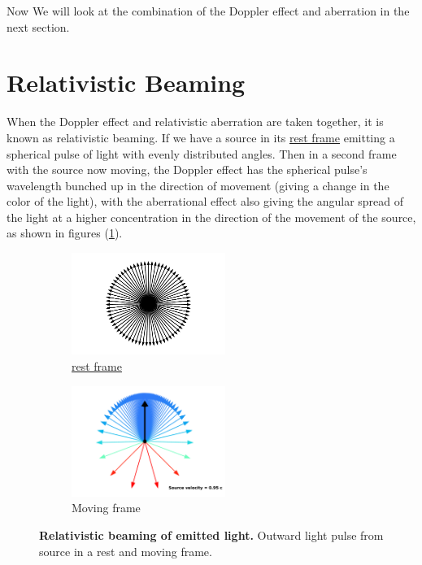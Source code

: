 Now We will look at the combination of the Doppler effect and aberration in the next section.

\section{Relativistic Beaming} \label{sect: Intro Relativistic Beaming}

When the Doppler effect and relativistic aberration are taken together, it is known as relativistic beaming.
If we have a source in its \hyperlink{def-proper-frame}{rest frame} emitting a spherical pulse of light with evenly distributed angles.
Then in a second frame with the source now moving, the Doppler effect has the spherical pulse's wavelength bunched up in the direction of movement (giving a change in the color of the light), with the aberrational effect also giving the angular spread of the light at a higher concentration in the direction of the movement of the source, as shown in figures (\ref{fig: Relativistic Beaming}).

\begin{figure}[H]
	\begin{subfigure}{.49\textwidth}
		\centering
		\includegraphics[width = 5cm]{images/pdf/Rest_velocities.pdf}
		\caption{\hyperlink{def-proper-frame}{rest frame}}
	\end{subfigure}
	\begin{subfigure}{.49\textwidth}
		\centering
		\includegraphics[width = 5cm]{images/pdf/Aberrated_velocities.pdf}
		\caption{Moving frame}
	\end{subfigure}
	\caption{\textbf{Relativistic beaming of emitted light.} Outward light pulse from source in a rest and moving frame.}
	\label{fig: Relativistic Beaming}
\end{figure}

